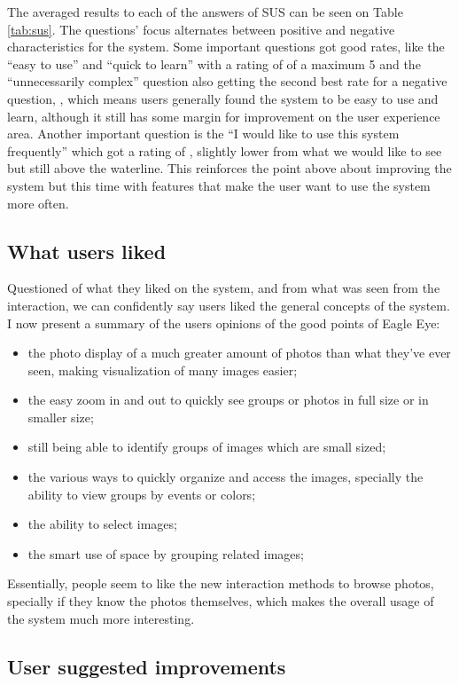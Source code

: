 The averaged results to each of the answers of \ac{SUS} can be seen on Table \ref{tab:sus}. The questions' focus alternates between positive and negative characteristics for the system. Some important questions got good rates, like the ``easy to use'' and ``quick to learn'' with a rating of  of a maximum 5 and the ``unnecessarily complex'' question also getting the second best rate for a negative question, , which means users generally found the system to be easy to use and learn, although it still has some margin for improvement on the user experience area. Another important question is the ``I would like to use this system frequently'' which got a rating of , slightly lower from what we would like to see but still above the waterline. This reinforces the point above about improving the system but this time with features that make the user want to use the system more often.

\subsection{What users liked}

Questioned of what they liked on the system, and from what was seen from the interaction, we can confidently say users liked the general concepts of the system. I now present a summary of the users opinions of the good points of Eagle Eye:
\begin{itemize}
\item the photo display of a much greater amount of photos than what they've ever seen, making visualization of many images easier;
\item the easy zoom in and out to quickly see groups or photos in full size or in smaller size;
\item still being able to identify groups of images which are small sized;
\item the various ways to quickly organize and access the images, specially the ability to view groups by events or colors;
\item the ability to select images;
\item the smart use of space by grouping related images;
\end{itemize}

Essentially, people seem to like the new interaction methods to browse photos, specially if they know the photos themselves, which makes the overall usage of the system much more interesting.

\subsection{User suggested improvements}

